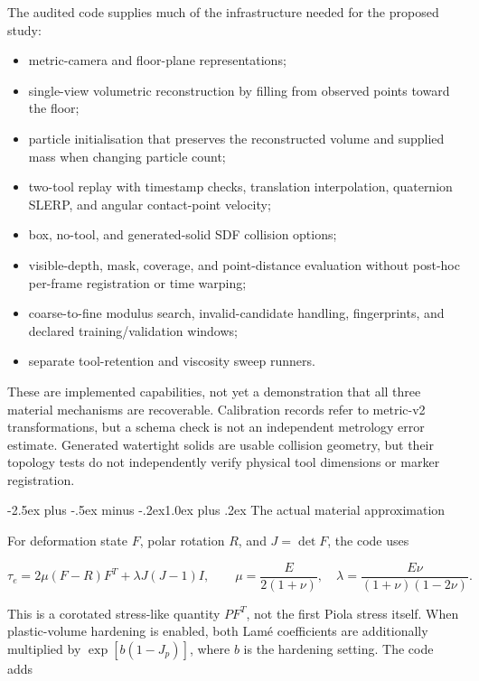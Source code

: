 \documentclass[
  11pt,
]{article}
\makeatletter
\providecommand{\tightlist}{%
  \setlength{\itemsep}{0pt}\setlength{\parskip}{0pt}}
\renewcommand\subsection{\needspace{5\baselineskip}\@startsection{subsection}{2}{\z@}%
  {-2.5ex plus -.5ex minus -.2ex}{1.0ex plus .2ex}%
  {\normalfont\sffamily\large\bfseries\color{accent}}}
\makeatother
\begin{document}
The audited code supplies much of the infrastructure needed for the
proposed study:

\begin{itemize}
\tightlist
\item
  metric-camera and floor-plane representations;
\item
  single-view volumetric reconstruction by filling from observed points
  toward the floor;
\item
  particle initialisation that preserves the reconstructed volume and
  supplied mass when changing particle count;
\item
  two-tool replay with timestamp checks, translation interpolation,
  quaternion SLERP, and angular contact-point velocity;
\item
  box, no-tool, and generated-solid SDF collision options;
\item
  visible-depth, mask, coverage, and point-distance evaluation without
  post-hoc per-frame registration or time warping;
\item
  coarse-to-fine modulus search, invalid-candidate handling,
  fingerprints, and declared training/validation windows;
\item
  separate tool-retention and viscosity sweep runners.
\end{itemize}

These are implemented capabilities, not yet a demonstration that all
three material mechanisms are recoverable. Calibration records refer to
metric-v2 transformations, but a schema check is not an independent
metrology error estimate. Generated watertight solids are usable
collision geometry, but their topology tests do not independently verify
physical tool dimensions or marker registration.

\subsection{The actual material
approximation}\label{the-actual-material-approximation}

For deformation state \(F\), polar rotation \(R\), and \(J=\det F\), the
code uses

\[
\tau_e=2\mu(F-R)F^T+\lambda J(J-1)I,
\qquad
\mu=\frac{E}{2(1+\nu)},\quad
\lambda=\frac{E\nu}{(1+\nu)(1-2\nu)}.
\]

This is a corotated stress-like quantity \(PF^T\), not the first Piola
stress itself. When plastic-volume hardening is enabled, both Lamé
coefficients are additionally multiplied by \(\exp[b(1-J_p)]\), where
\(b\) is the hardening setting. The code adds
\end{document}
